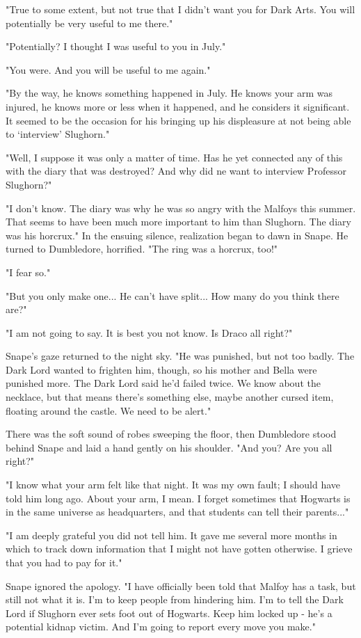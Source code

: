 \documentclass[a4paper,11pt]{article}
\begin{document}
"True to some extent, but not true that I didn't want you for Dark Arts. You will potentially be very useful to me there."

"Potentially? I thought I was useful to you in July."

"You were. And you will be useful to me again."

"By the way, he knows something happened in July. He knows your arm was injured, he knows more or less when it happened, and he considers it significant. It seemed to be the occasion for his bringing up his displeasure at not being able to `interview' Slughorn."

"Well, I suppose it was only a matter of time. Has he yet connected any of this with the diary that was destroyed? And why did ne want to interview Professor Slughorn?"

"I don't know. The diary was why he was so angry with the Malfoys this summer. That seems to have been much more important to him than Slughorn. The diary was his horcrux." In the ensuing silence, realization began to dawn in Snape. He turned to Dumbledore, horrified. "The ring was a horcrux, too!"

"I fear so."

"But you only make one... He can't have split... How many do you think there are?"

"I am not going to say. It is best you not know. Is Draco all right?"

Snape's gaze returned to the night sky. "He was punished, but not too badly. The Dark Lord wanted to frighten him, though, so his mother and Bella were punished more. The Dark Lord said he'd failed twice. We know about the necklace, but that means there's something else, maybe another cursed item, floating around the castle. We need to be alert."

There was the soft sound of robes sweeping the floor, then Dumbledore stood behind Snape and laid a hand gently on his shoulder. "And you? Are you all right?"

"I know what your arm felt like that night. It was my own fault; I should have told him long ago. About your arm, I mean. I forget sometimes that Hogwarts is in the same universe as headquarters, and that students can tell their parents..."

"I am deeply grateful you did not tell him. It gave me several more months in which to track down information that I might not have gotten otherwise. I grieve that you had to pay for it."

Snape ignored the apology. "I have officially been told that Malfoy has a task, but still not what it is. I'm to keep people from hindering him. I'm to tell the Dark Lord if Slughorn ever sets foot out of Hogwarts. Keep him locked up - he's a potential kidnap victim. And I'm going to report every move you make."
\end{document}
